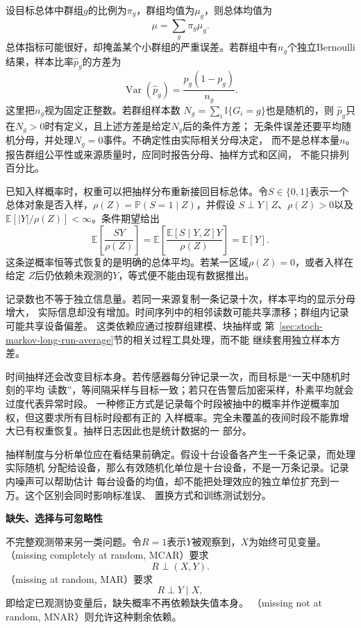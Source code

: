 设目标总体中群组\(g\)的比例为\(\pi_g\)，群组均值为\(\mu_g\)，则总体均值为
\[
  \mu=\sum_g\pi_g\mu_g.
\]
总体指标可能很好，却掩盖某个小群组的严重误差。若群组中有\(n_g\)个独立Bernoulli
结果，样本比率\(\widehat p_g\)的方差为
\[
  \operatorname{Var}(\widehat p_g)
  =\frac{p_g(1-p_g)}{n_g}.
\]
这里把\(n_g\)视为固定正整数。若群组样本数
\(N_g=\sum_i\mathbb{I}\{G_i=g\}\)也是随机的，则
\(\widehat p_g\)只在\(N_g>0\)时有定义，且上述方差是给定\(N_g\)后的条件方差；
无条件误差还要平均随机分母，并处理\(N_g=0\)事件。不确定性由实际相关分母决定，
而不是总样本量\(n\)。报告群组公平性或来源质量时，应同时报告分母、抽样方式和区间，
不能只排列百分比。

已知入样概率时，权重可以把抽样分布重新接回目标总体。令\(S\in\{0,1\}\)表示一个
总体对象是否入样，\(\rho(Z)=\mathbb{P}(S=1\mid Z)\)，并假设
\(S\mathrel{\perp}Y\mid Z\)、\(\rho(Z)>0\)以及
\(\mathbb{E}[|Y|/\rho(Z)]<\infty\)。条件期望给出
\[
  \mathbb{E}\left[\frac{SY}{\rho(Z)}\right]
  =\mathbb{E}\left[
    \frac{\mathbb{E}[S\mid Y,Z]Y}{\rho(Z)}
  \right]
  =\mathbb{E}[Y].
\]
这条逆概率恒等式恢复的是明确的总体平均。若某一区域\(\rho(Z)=0\)，或者入样在给定
\(Z\)后仍依赖未观测的\(Y\)，等式便不能由现有数据推出。

记录数也不等于独立信息量。若同一来源复制一条记录十次，样本平均的显示分母增大，
实际信息却没有增加。时间序列中的相邻读数可能共享漂移；群组内记录可能共享设备偏差。
这类依赖应通过按群组建模、块抽样或
第~\ref{sec:stoch-markov-long-run-average}节的相关过程工具处理，而不能
继续套用独立样本方差。

时间抽样还会改变目标本身。若传感器每分钟记录一次，而目标是“一天中随机时刻的平均
读数”，等间隔采样与目标一致；若只在告警后加密采样，朴素平均就会过度代表异常时段。
一种修正方式是记录每个时段被抽中的概率并作逆概率加权，但这要求所有目标时段都有正的
入样概率。完全未覆盖的夜间时段不能靠增大已有权重恢复。抽样日志因此也是统计数据的一
部分。

抽样制度与分析单位应在看结果前确定。假设十台设备各产生一千条记录，而处理实际随机
分配给设备，那么有效随机化单位是十台设备，不是一万条记录。记录内噪声可以帮助估计
每台设备的均值，却不能把处理效应的独立单位扩充到一万。这个区别会同时影响标准误、
置换方式和训练测试划分。

\par\medskip\noindent\textbf{缺失、选择与可忽略性}\quad

不完整观测带来另一类问题。令\(R=1\)表示\(Y\)被观察到，\(X\)为始终可见变量。
（missing completely at random, MCAR）要求
\[
  R\mathrel{\perp}(X,Y).
\]
（missing at random, MAR）要求
\[
  R\mathrel{\perp}Y\mid X,
\]
即给定已观测协变量后，缺失概率不再依赖缺失值本身。
（missing not at random, MNAR）则允许这种剩余依赖。

